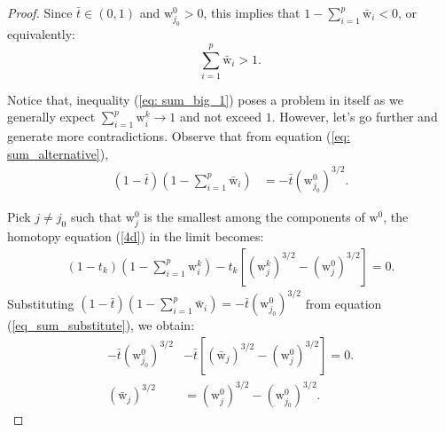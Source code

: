 \documentclass[11pt,pdflatex,sn-mathphys-ay]{sn-jnl}%
\theoremstyle{definition}
\theoremstyle{thmstyleone}%
\theoremstyle{thmstyletwo}%
\theoremstyle{thmstylethree}%
\begin{document}
\begin{proof}
		
		\noindent Since $\bar{t} \in (0, 1)$ and $\text{w}^0_{j_0} > 0$, this implies that $1 - \sum_{i=1}^p \bar{\text{w}}_i < 0$, or equivalently:
		\begin{equation} \label{eq: sum_big_1}
			\displaystyle \sum_{i=1}^p \bar{\text{w}}_i > 1.
		\end{equation}
		
		\noindent Notice that, inequality (\ref{eq: sum_big_1}) poses a problem in itself as we generally expect $\displaystyle \sum_{i=1}^p \text{w}^k_i \to 1$ and not exceed $1.$ However, let's go further and generate more contradictions. Observe that from equation (\ref{eq: sum_alternative}), 
		\begin{align}
			(1 - \bar{t})\left(1 - \sum_{i=1}^p \bar{\text{w}}_i\right) & = -\bar{t} (\text{w}^0_{j_0})^{3/2}. \label{eq_sum_substitute}
		\end{align}
		
		\noindent Pick $j \neq j_0$ such that $\text{w}_j^0$ is the smallest among the components of $\text{w}^0$, the homotopy equation (\ref{4d}) in the limit becomes:
		\begin{align}
			(1 - t_k)\left(1 - \sum_{i=1}^p \text{w}^k_i\right) - t_k \left[ (\text{w}^k_{j})^{3/2} - (\text{w}^0_{j})^{3/2} \right] = 0.
		\end{align}
		\noindent Substituting $\displaystyle (1 - \bar{t})\left(1 - \sum_{i=1}^p \bar{\text{w}}_i\right)  = -\bar{t} (\text{w}^0_{j_0})^{3/2}$ from equation (\ref{eq_sum_substitute}), we obtain:
		\begin{align}
			-\bar{t} \left(\text{w}^0_{j_0}\right)^{3/2} &- \bar t \left[ (\bar {\text{w}}_{j})^{3/2} - (\text{w}^0_{j})^{3/2} \right] = 0. \nonumber \\
			(\bar{\text{w}}_j)^{3/2} &= (\text{w}_j^0)^{3/2} - (\text{w}_{j_0}^0)^{3/2}. \label{eq:w_depending}
		\end{align}
		

\end{proof}
\end{document}
